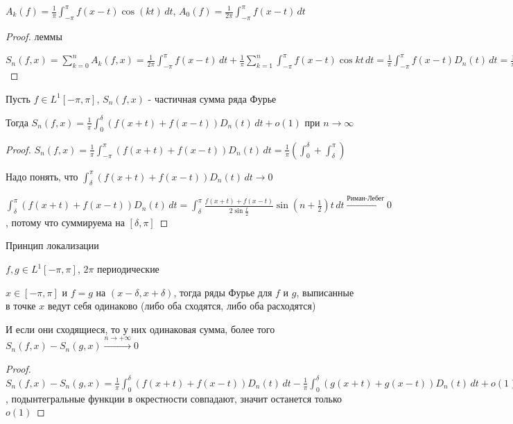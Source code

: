 $A_k (f) = \frac{1}{\pi} \int_{-\pi}^\pi f(x - t) \cos (kt) \, dt$, $A_0 (f) = \frac{1}{2\pi} \int_{-\pi}^\pi f(x - t) \, dt$

\begin{proof}
    леммы

    $S_n (f, x) = \sum_{k = 0}^n A_k (f, x) = \frac{1}{2\pi} \int_{-\pi}^\pi f(x - t) \, dt +  \frac{1}{\pi} \sum_{k = 1}^{n} \int_{-\pi}^\pi f(x - t) \cos kt \, dt = 
    \frac{1}{\pi} \int_{-\pi}^\pi f(x - t) D_n (t) \, dt = \frac{1}{\pi} \int_{-\pi}^\pi f(x + u) D_n (u) (-1) \, du$
\end{proof}

\begin{consequence}
    Пусть $f \in L^1 [-\pi, \pi]$, $S_n (f, x)$ - частичная сумма ряда Фурье

    Тогда $S_n (f, x) = \frac{1}{\pi} \int_0^\delta (f(x + t) + f(x - t)) D_n (t) \, dt + o(1)$ при $n \to \infty$
\end{consequence}

\begin{proof}
    $S_n (f, x) = \frac{1}{\pi} \int_{-\pi}^\pi (f(x + t) + f(x - t)) D_n (t) \,  dt = \frac{1}{\pi} \left( \int_{0}^\delta + \int_\delta^\pi \right)$

    Надо понять, что $\int_{\delta}^\pi (f(x + t) + f(x - t)) D_n (t) \,  dt \rightarrow 0$

    $\int_{\delta}^\pi (f(x + t) + f(x - t)) D_n (t) \,  dt = \int_\delta^\pi \frac{f(x + t) + f(x - t)}{2 \sin \frac{t}{2}} \sin (n + \frac{1}{2}) t \, dt \overset{\text{Риман-Лебег}}{\rightarrow} 0$, потому что суммируема на $[\delta, \pi]$
\end{proof}

\begin{consequence}
    Принцип локализации

    $f, g \in L^1 [-\pi, \pi]$, $2\pi$ периодические

    $x \in [-\pi, \pi]$ и $f = g$ на $(x - \delta, x + \delta)$, тогда ряды Фурье для $f$ и $g$, выписанные в точке $x$ ведут себя одинаково (либо оба сходятся, либо оба расходятся)

    И если они сходящиеся, то у них одинаковая сумма, более того $S_n (f, x) - S_n (g, x) \overset{n \to +\infty}{\rightarrow} 0$
\end{consequence}

\begin{proof}
    $S_n (f, x) - S_n (g, x) = \frac{1}{\pi} \int_0^\delta (f(x + t) + f(x - t)) D_n (t) \, dt - \frac{1}{\pi} \int_0^\delta (g(x + t) + g(x - t)) D_n (t) \, dt + o(1)$, подынтегральные функции в окрестности совпадают, значит останется только $o(1)$
\end{proof}

